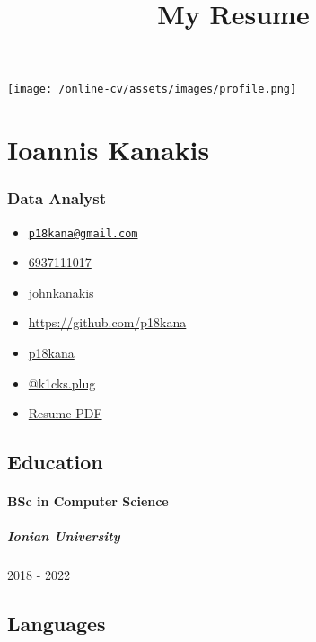 \documentclass[
]{article}
\title{My Resume}
\author{}
\date{}
\providecommand{\tightlist}{%
  \setlength{\itemsep}{0pt}\setlength{\parskip}{0pt}}
\begin{document}
\maketitle

\texttt{[image: /online-cv/assets/images/profile.png]}

\hypertarget{ioannis-kanakis}{%
\section{Ioannis Kanakis}\label{ioannis-kanakis}}

\hypertarget{data-analyst}{%
\subsubsection{Data Analyst}\label{data-analyst}}

\begin{itemize}
\tightlist
\item
  \emph{} \href{mailto:p18kana@gmail.com}{\nolinkurl{p18kana@gmail.com}}
\item
  \emph{} \href{tel:6937111017}{6937111017}
\item
  \emph{} \href{https://t.me/johnkanakis}{johnkanakis}
\item
  \emph{}
  \href{http://https://github.com/p18kana}{https://github.com/p18kana}
\item
  \emph{} \href{http://github.com/p18kana}{p18kana}
\item
  \emph{} \href{https://twitter.com/@k1cks.plug}{@k1cks.plug}
\item
  \emph{} \href{http://www.africau.edu/images/default/sample.pdf}{Resume
  PDF}
\end{itemize}

\hypertarget{education}{%
\subsection{Education}\label{education}}

\hypertarget{bsc-in-computer-science}{%
\paragraph{BSc in Computer Science}\label{bsc-in-computer-science}}

\hypertarget{ionian-university}{%
\subparagraph{Ionian University}\label{ionian-university}}

2018 - 2022

\hypertarget{languages}{%
\subsection{Languages}\label{languages}}
\end{document}
